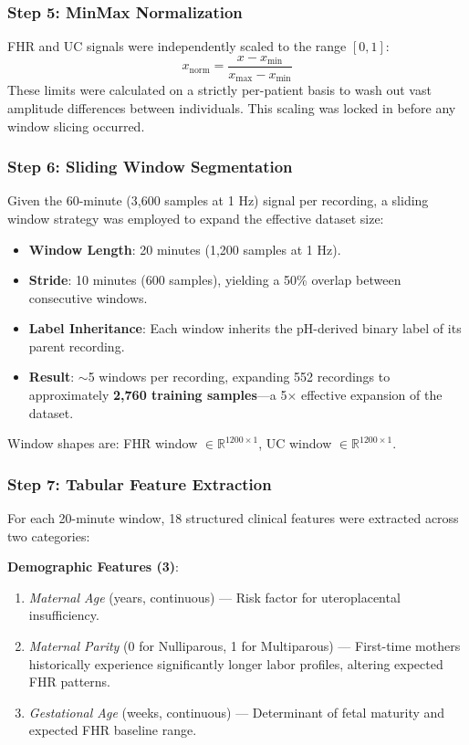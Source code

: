 \documentclass[conference]{IEEEtran}
\begin{document}
\subsubsection{Step 5: MinMax Normalization}
FHR and UC signals were independently scaled to the range $[0, 1]$:
\begin{equation}
    x_{\text{norm}} = \frac{x - x_{\min}}{x_{\max} - x_{\min}}
\end{equation}
These limits were calculated on a strictly per-patient basis to wash out vast amplitude differences between individuals. This scaling was locked in before any window slicing occurred.

\subsubsection{Step 6: Sliding Window Segmentation}
Given the 60-minute (3,600 samples at 1 Hz) signal per recording, a sliding
window strategy was employed to expand the effective dataset size:
\begin{itemize}
    \item \textbf{Window Length}: 20 minutes (1,200 samples at 1 Hz).
    \item \textbf{Stride}: 10 minutes (600 samples), yielding a 50\% overlap
    between consecutive windows.
    \item \textbf{Label Inheritance}: Each window inherits the pH-derived binary
    label of its parent recording.
    \item \textbf{Result}: $\sim$5 windows per recording, expanding 552
    recordings to approximately \textbf{2,760 training samples}—a 5$\times$
    effective expansion of the dataset.
\end{itemize}
Window shapes are: FHR window $\in \mathbb{R}^{1200 \times 1}$,
UC window $\in \mathbb{R}^{1200 \times 1}$.

\subsubsection{Step 7: Tabular Feature Extraction}

For each 20-minute window, 18 structured clinical features were extracted
across two categories:

\textbf{Demographic Features (3)}:
\begin{enumerate}
    \item \textit{Maternal Age} (years, continuous) — Risk factor for
    uteroplacental insufficiency.
    \item \textit{Maternal Parity} (0 for Nulliparous, 1 for Multiparous) —
    First-time mothers historically experience significantly longer labor profiles, altering expected FHR patterns.
    \item \textit{Gestational Age} (weeks, continuous) — Determinant of
    fetal maturity and expected FHR baseline range.
\end{enumerate}
\end{document}
